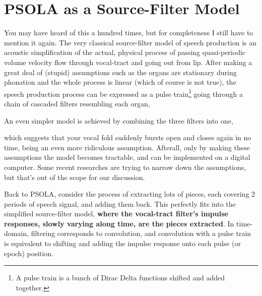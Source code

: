 \documentclass{article}
\begin{document}
\section{PSOLA as a Source-Filter Model}

You may have heard of this a hundred times, but for completeness I still have to mention it again. The very classical source-filter model of speech production is an acoustic simplification of the actual, physical process of passing quasi-periodic volume velocity flow through vocal-tract and going out from lip. After making a great deal of (stupid) assumptions such as the organs are stationary during phonation and the whole process is linear (which of course is not true), the speech production process can be expressed as a pulse train\footnote{A pulse train is a bunch of Dirac Delta functions shifted and added together.} going through a chain of cascaded filters resembling each organ,

\begin{center}
\end{center}

An even simpler model is achieved by combining the three filters into one,

\bigskip

\begin{center}
\end{center}

which suggests that your vocal fold suddenly bursts open and closes again in no time, being an even more ridiculous assumption. Afterall, only by making these assumptions the model becomes tractable, and can be implemented on a digital computer. Some recent researches are trying to narrow down the assumptions, but that's out of the scope for our discussion.

Back to PSOLA, consider the process of extracting lots of pieces, each covering 2 periods of speech signal, and adding them back. This perfectly fits into the simplified source-filter model, \textbf{where the vocal-tract filter's impulse responses, slowly varying along time, are the pieces extracted}. In time-domain, filtering corresponds to convolution, and convolution with a pulse train is equivalent to shifting and adding the impulse response onto each pulse (or epoch) position.
\end{document}
